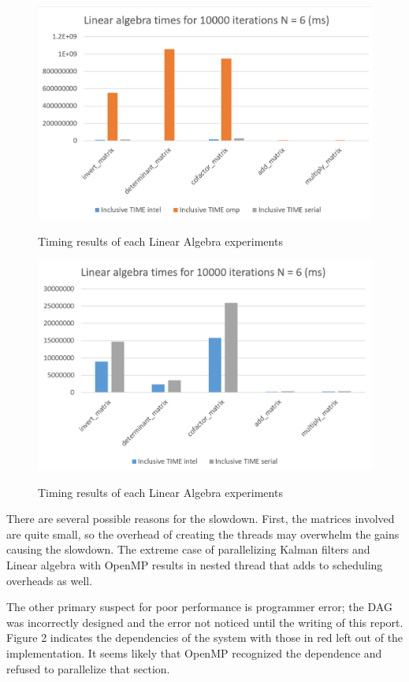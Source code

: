 \begin{figure}[h]
\includegraphics[width=\textwidth]{results_LA1.png}
\label{fig:all_linear}
 \caption{Timing results of each Linear Algebra experiments}
\end{figure}

\begin{figure}[h]
\includegraphics[width=\textwidth]{results_LA2.png}
\label{fig:some_linear}
 \caption{Timing results of each Linear Algebra experiments}
\end{figure}


There are several possible reasons for the slowdown. First, the matrices involved are quite small, so the overhead of creating the threads may overwhelm the gains causing the slowdown. The extreme case of parallelizing Kalman filters and Linear algebra with OpenMP results in nested thread that adds to scheduling overheads as well. 

The other primary suspect for poor performance is programmer error; the DAG was incorrectly designed and the error not noticed until the writing of this report. Figure 2 indicates the dependencies of the system with those in red left out of the implementation. It seems likely that OpenMP recognized the dependence and refused to parallelize that section.


